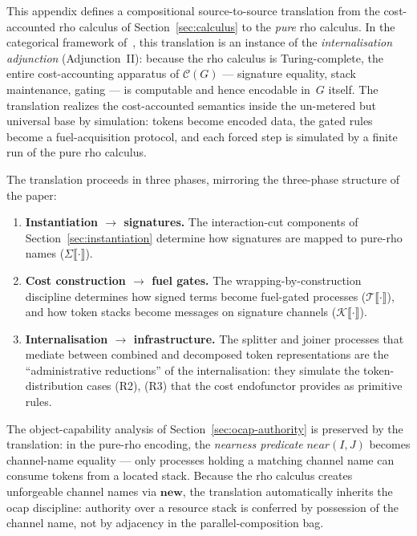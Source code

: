 \documentclass[11pt,a4paper]{article}
\newcommand{\lsem}{\llbracket}
\newcommand{\rsem}{\rrbracket}
\begin{document}
This appendix defines a compositional source-to-source
translation from the cost-accounted rho calculus of
Section~\ref{sec:calculus} to the \emph{pure} rho calculus.
In the categorical framework of~\cite{CostEndofunctor}, this
translation is an instance of the \emph{internalisation
adjunction} (Adjunction~II): because the rho calculus is
Turing-complete, the entire cost-accounting apparatus of
$\mathcal{C}(G)$ --- signature equality, stack maintenance,
gating --- is computable and hence encodable in~$G$ itself.
The translation realizes the cost-accounted semantics inside
the un-metered but universal base by simulation: tokens become
encoded data, the gated rules become a fuel-acquisition
protocol, and each forced step is simulated by a finite run of
the pure rho calculus.

The translation proceeds in three phases, mirroring the
three-phase structure of the paper:

\begin{enumerate}[label=\textbf{Phase \arabic*.}, nosep]
  \item \textbf{Instantiation $\to$ signatures.}
    The interaction-cut components of
    Section~\ref{sec:instantiation} determine how signatures
    are mapped to pure-rho names ($\Sigma\lsem\cdot\rsem$).
  \item \textbf{Cost construction $\to$ fuel gates.}
    The wrapping-by-construction discipline determines how
    signed terms become fuel-gated processes
    ($\mathcal{T}\lsem\cdot\rsem$), and how token stacks
    become messages on signature channels
    ($\mathcal{K}\lsem\cdot\rsem$).
  \item \textbf{Internalisation $\to$ infrastructure.}
    The splitter and joiner processes that mediate between
    combined and decomposed token representations are the
    ``administrative reductions'' of the internalisation:
    they simulate the token-distribution cases (R2), (R3)
    that the cost endofunctor provides as primitive rules.
\end{enumerate}

\noindent
The object-capability analysis of
Section~\ref{sec:ocap-authority} is preserved by the
translation: in the pure-rho encoding, the \emph{nearness
predicate} $\mathit{near}(I, J)$ becomes channel-name equality
--- only processes holding a matching channel name can consume
tokens from a located stack.  Because the rho calculus creates
unforgeable channel names via $\mathbf{new}$, the translation
automatically inherits the ocap discipline: authority over a
resource stack is conferred by possession of the channel name,
not by adjacency in the parallel-composition bag.
\end{document}
